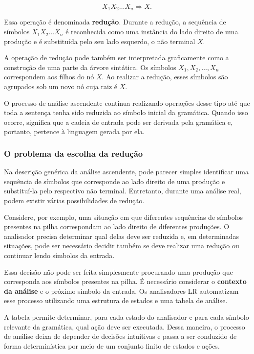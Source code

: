 \documentclass[
  brazilian,
  letterpaper,
]{book}
\theoremstyle{plain}
\theoremstyle{definition}
\theoremstyle{remark}
\begin{document}
\[
X_1X_2\ldots X_n\Rightarrow X.
\]

Essa operação é denominada \textbf{redução}. Durante a redução, a
sequência de símbolos \(X_1X_2\ldots X_n\) é reconhecida como uma
instância do lado direito de uma produção e é substituída pelo seu lado
esquerdo, o não terminal \(X\).

A operação de redução pode também ser interpretada graficamente como a
construção de uma parte da árvore sintática. Os símbolos
\(X_1,X_2,\ldots,X_n\) correspondem aos filhos do nó \(X\). Ao realizar
a redução, esses símbolos são agrupados sob um novo nó cuja raiz é
\(X\).

O processo de análise ascendente continua realizando operações desse
tipo até que toda a sentença tenha sido reduzida ao símbolo inicial da
gramática. Quando isso ocorre, significa que a cadeia de entrada pode
ser derivada pela gramática e, portanto, pertence à linguagem gerada por
ela.

\subsubsection{O problema da escolha da
redução}\label{o-problema-da-escolha-da-reduuxe7uxe3o}

Na descrição genérica da análise ascendente, pode parecer simples
identificar uma sequência de símbolos que corresponde ao lado direito de
uma produção e substituí-la pelo respectivo não terminal. Entretanto,
durante uma análise real, podem existir várias possibilidades de
redução.

Considere, por exemplo, uma situação em que diferentes sequências de
símbolos presentes na pilha correspondam ao lado direito de diferentes
produções. O analisador precisa determinar qual delas deve ser reduzida
e, em determinadas situações, pode ser necessário decidir também se deve
realizar uma redução ou continuar lendo símbolos da entrada.

Essa decisão não pode ser feita simplesmente procurando uma produção que
corresponda aos símbolos presentes na pilha. É necessário considerar o
\textbf{contexto da análise} e o próximo símbolo da entrada. Os
analisadores LR automatizam esse processo utilizando uma estrutura de
estados e uma tabela de análise.

A tabela permite determinar, para cada estado do analisador e para cada
símbolo relevante da gramática, qual ação deve ser executada. Dessa
maneira, o processo de análise deixa de depender de decisões intuitivas
e passa a ser conduzido de forma determinística por meio de um conjunto
finito de estados e ações.
\end{document}
